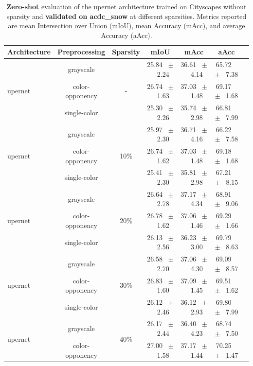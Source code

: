 \begin{table}[h]
  \centering
  \caption{\textbf{Zero-shot} evaluation of the upernet architecture trained on Cityscapes without sparsity and \textbf{validated on acdc_snow} at different sparsities. Metrics reported are mean Intersection over Union (mIoU), mean Accuracy (mAcc), and average Accuracy (aAcc).}
  \begin{tabular}{@{}lccc ccc@{}}
    \toprule
    Architecture & Preprocessing & Sparsity & mIoU & mAcc & aAcc \\
    \midrule
    \multirow{3}{*}{upernet} & grayscale & \multirow{3}{*}{-} & 25.84 ~$\pm$~ 2.24 & 36.61 ~$\pm$~ 4.14 & 65.72 ~$\pm$~ 7.38 \\
    & color-opponency &  & 26.74 ~$\pm$~ 1.63 & 37.03 ~$\pm$~ 1.48 & 69.17 ~$\pm$~ 1.68 \\
    & single-color &  & 25.30 ~$\pm$~ 2.26 & 35.74 ~$\pm$~ 2.98 & 66.81 ~$\pm$~ 7.99 \\
    \midrule
    \multirow{3}{*}{upernet} & grayscale & \multirow{3}{*}{10\%} & 25.97 ~$\pm$~ 2.30 & 36.71 ~$\pm$~ 4.16 & 66.22 ~$\pm$~ 7.58 \\
    & color-opponency &  & 26.74 ~$\pm$~ 1.62 & 37.03 ~$\pm$~ 1.48 & 69.18 ~$\pm$~ 1.68 \\
    & single-color &  & 25.41 ~$\pm$~ 2.30 & 35.81 ~$\pm$~ 2.98 & 67.21 ~$\pm$~ 8.15 \\
    \midrule
    \multirow{3}{*}{upernet} & grayscale & \multirow{3}{*}{20\%} & 26.64 ~$\pm$~ 2.78 & 37.17 ~$\pm$~ 4.34 & 68.91 ~$\pm$~ 9.06 \\
    & color-opponency &  & 26.78 ~$\pm$~ 1.62 & 37.06 ~$\pm$~ 1.46 & 69.29 ~$\pm$~ 1.66 \\
    & single-color &  & 26.13 ~$\pm$~ 2.56 & 36.23 ~$\pm$~ 3.00 & 69.79 ~$\pm$~ 8.63 \\
    \midrule
    \multirow{3}{*}{upernet} & grayscale & \multirow{3}{*}{30\%} & 26.58 ~$\pm$~ 2.70 & 37.06 ~$\pm$~ 4.30 & 69.09 ~$\pm$~ 8.57 \\
    & color-opponency &  & 26.83 ~$\pm$~ 1.60 & 37.09 ~$\pm$~ 1.45 & 69.51 ~$\pm$~ 1.62 \\
    & single-color &  & 26.12 ~$\pm$~ 2.46 & 36.12 ~$\pm$~ 2.93 & 69.80 ~$\pm$~ 7.99 \\
    \midrule
    \multirow{3}{*}{upernet} & grayscale & \multirow{3}{*}{40\%} & 26.17 ~$\pm$~ 2.44 & 36.40 ~$\pm$~ 4.23 & 68.74 ~$\pm$~ 7.50 \\
    & color-opponency &  & 27.00 ~$\pm$~ 1.58 & 37.17 ~$\pm$~ 1.44 & 70.25 ~$\pm$~ 1.47 \\

\end{tabular}
\end{table}
